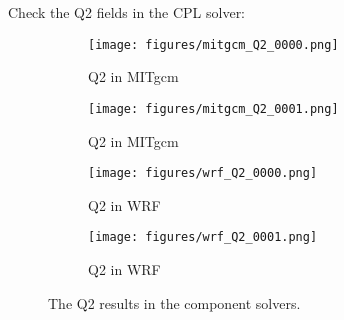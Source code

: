 
Check the Q2 fields in the CPL solver:

\begin{figure}[h!]
\centering
  \begin{subfigure}[b]{0.45\linewidth}
  \texttt{[image: figures/mitgcm\_Q2\_0000.png]}
  \caption{Q2 in MITgcm}
  \end{subfigure}
  \begin{subfigure}[b]{0.45\linewidth}
  \texttt{[image: figures/mitgcm\_Q2\_0001.png]}
  \caption{Q2 in MITgcm}
  \end{subfigure}
  \hspace{0.1in}
  \begin{subfigure}[b]{0.45\linewidth}
  \texttt{[image: figures/wrf\_Q2\_0000.png]}
  \caption{Q2 in WRF}
  \end{subfigure}
  \begin{subfigure}[b]{0.45\linewidth}
  \texttt{[image: figures/wrf\_Q2\_0001.png]}
  \caption{Q2 in WRF}
  \end{subfigure}
\caption{The Q2 results in the component solvers.}
\label{fig:q2}
\end{figure}
